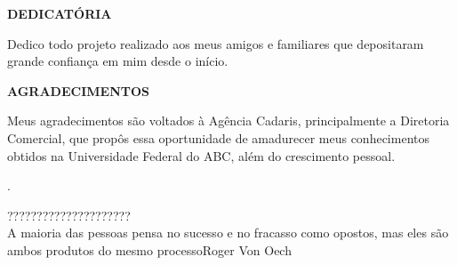 \documentclass[
  12pt,				%
  openany,
  oneside,
  a4paper,			%
  english,			%
  brazil
]{article}
\numberwithin{figure}{section}
\numberwithin{table}{section}
\begin{document}

\begin{titlepage}

\begin{center}
\textbf{DEDICATÓRIA}
\end{center}

Dedico todo projeto realizado aos meus amigos e familiares que depositaram grande confiança em mim desde o início.


\end{titlepage}


\begin{titlepage}

\begin{center}
\textbf{AGRADECIMENTOS}
\end{center}

Meus agradecimentos são voltados à Agência Cadaris, principalmente a Diretoria Comercial, que propôs essa oportunidade de amadurecer meus conhecimentos obtidos na Universidade Federal do ABC, além do crescimento pessoal.


\end{titlepage}


\begin{titlepage}


.\\\vspace{18cm}
\begin{raggedleft}

\begin{epigraph} {????????????????????? \\A maioria das pessoas pensa no sucesso e no fracasso como opostos, mas eles são ambos produtos do mesmo processo}{Roger Von Oech}

\end{epigraph}
\end{raggedleft}

\end{titlepage}

\end{document}
